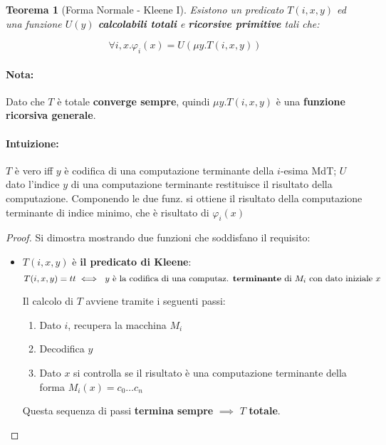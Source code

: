 \documentclass[a4paper,10pt,oneside]{article}
\theoremstyle{break}
\newtheorem{teo}{Teorema}[subsection]
\begin{document}
\begin{mdframed}
\begin{teo}[Forma Normale - Kleene I]

Esistono un predicato $T(i, x, y)$ ed una funzione $U(y)$ \textbf{calcolabili totali} e \textbf{ricorsive primitive} tali che:

\[ \forall i, x . \varphi_i (x) = U(\mu y.T(i, x, y)) \]

\end{teo}
\paragraph{Nota:} Dato che $T$ è totale \textbf{converge sempre}, quindi $\mu y.T(i, x, y)$ è una \textbf{funzione ricorsiva generale}.

\dotfill

\paragraph{Intuizione:} $T$ è vero iff $y$ è codifica di una computazione terminante della $i$-esima MdT; $U$ dato l'indice $y$ di una computazione terminante restituisce il risultato della computazione. Componendo le due funz. si ottiene il risultato della computazione terminante di indice minimo, che è risultato di $\varphi_i(x)$

\dotfill

\begin{proof}
Si dimostra mostrando due funzioni che soddisfano il requisito:

\begin{itemize}
 \item $T(i, x, y)$ è \textbf{il predicato di Kleene}:
 \[ T(i, x, y) = tt \iff \text{ $y$ è la codifica di una computaz. \textbf{terminante} di $M_i$ con dato iniziale $x$} \]

 Il calcolo di $T$ avviene tramite i seguenti passi:

 \begin{enumerate}
  \item Dato $i$, recupera la macchina $M_i$
  \item Decodifica $y$
  \item Dato $x$ si controlla se il risultato è una computazione terminante della forma $M_i(x) = c_0 \hdots c_n$
 \end{enumerate}


 Questa sequenza di passi \textbf{termina sempre} $\implies$ $T$ \textbf{totale}.


\end{itemize}
\end{proof}
\end{mdframed}
\end{document}
